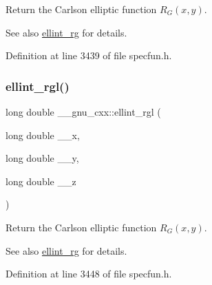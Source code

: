 Return the Carlson elliptic function $ R_G(x,y) $.

\begin{DoxySeeAlso}{See also}
\hyperlink{group__gnu__math__spec__func_gadf618529d6106c1c1bc1e9212c4fed12}{ellint\+\_\+rg} for details. 
\end{DoxySeeAlso}


Definition at line 3439 of file specfun.\+h.

\mbox{\label{group__gnu__math__spec__func_ga563455d515ed845988552432108a21be}} 
\subsubsection{\texorpdfstring{ellint\+\_\+rgl()}{ellint\_rgl()}}
{\footnotesize\ttfamily long double \+\_\+\+\_\+gnu\+\_\+cxx\+::ellint\+\_\+rgl (\begin{DoxyParamCaption}\item[{long double}]{\+\_\+\+\_\+x,  }\item[{long double}]{\+\_\+\+\_\+y,  }\item[{long double}]{\+\_\+\+\_\+z }\end{DoxyParamCaption})\hspace{0.3cm}{\ttfamily [inline]}}

Return the Carlson elliptic function $ R_G(x,y) $.

\begin{DoxySeeAlso}{See also}
\hyperlink{group__gnu__math__spec__func_gadf618529d6106c1c1bc1e9212c4fed12}{ellint\+\_\+rg} for details. 
\end{DoxySeeAlso}


Definition at line 3448 of file specfun.\+h.

\mbox{\label{group__gnu__math__spec__func_gadccabc8df929cc03745286ed1574a3ba}} 
